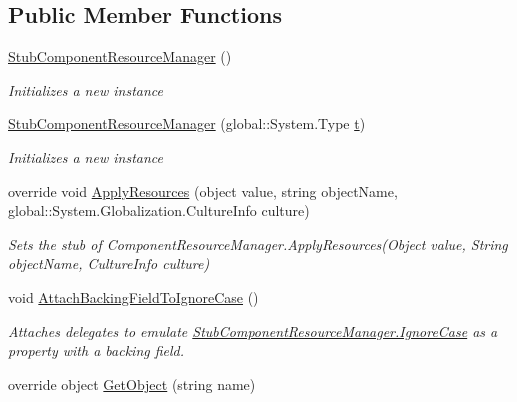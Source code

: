 \subsection*{Public Member Functions}
\begin{DoxyCompactItemize}
\item 
\hyperlink{class_system_1_1_component_model_1_1_fakes_1_1_stub_component_resource_manager_aa279a7d2a13c9349e9749a4c66131bde}{Stub\-Component\-Resource\-Manager} ()
\begin{DoxyCompactList}\small\item\em Initializes a new instance\end{DoxyCompactList}\item 
\hyperlink{class_system_1_1_component_model_1_1_fakes_1_1_stub_component_resource_manager_a1d341d0fca055b638b08fae9dfdba5c3}{Stub\-Component\-Resource\-Manager} (global\-::\-System.\-Type \hyperlink{jquery-1_810_82_8min_8js_a23c5666e83bbbceee94adcd0851f50c4}{t})
\begin{DoxyCompactList}\small\item\em Initializes a new instance\end{DoxyCompactList}\item 
override void \hyperlink{class_system_1_1_component_model_1_1_fakes_1_1_stub_component_resource_manager_a85b625f039c0d1417aaecb250cb77cc4}{Apply\-Resources} (object value, string object\-Name, global\-::\-System.\-Globalization.\-Culture\-Info culture)
\begin{DoxyCompactList}\small\item\em Sets the stub of Component\-Resource\-Manager.\-Apply\-Resources(\-Object value, String object\-Name, Culture\-Info culture)\end{DoxyCompactList}\item 
void \hyperlink{class_system_1_1_component_model_1_1_fakes_1_1_stub_component_resource_manager_a6ed8268b38c4a0720d04b7c7b1357c0c}{Attach\-Backing\-Field\-To\-Ignore\-Case} ()
\begin{DoxyCompactList}\small\item\em Attaches delegates to emulate \hyperlink{class_system_1_1_component_model_1_1_fakes_1_1_stub_component_resource_manager_a4b4b458e89601aa9b1676c787fd83d49}{Stub\-Component\-Resource\-Manager.\-Ignore\-Case} as a property with a backing field.\end{DoxyCompactList}\item 
override object \hyperlink{class_system_1_1_component_model_1_1_fakes_1_1_stub_component_resource_manager_a8815c3ffa2d7151fff505b4fb5bdfd58}{Get\-Object} (string name)

\end{DoxyCompactItemize}
